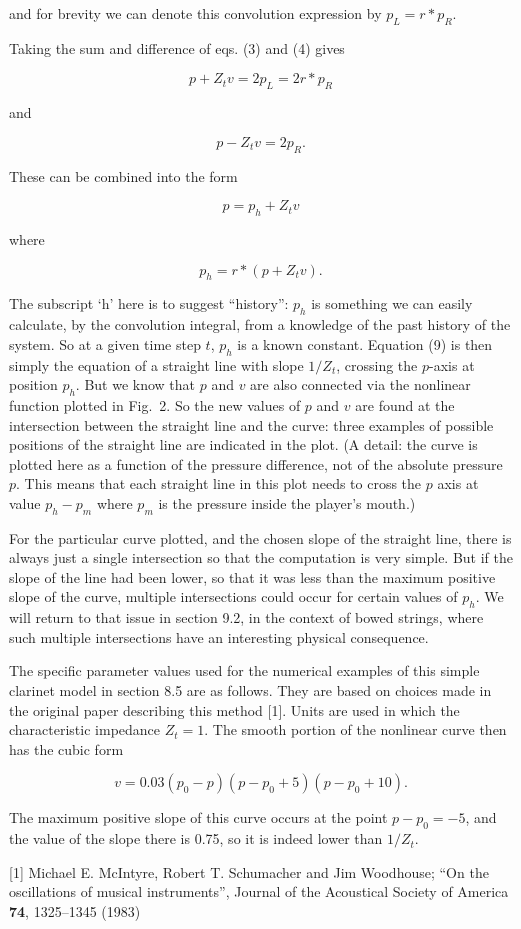   and for brevity we can denote this convolution expression by $p_L=r*p_R$. 

  Taking the sum and difference of eqs. (3) and (4) gives 

  $$p+Z_t v=2 p_L=2r*p_R \tag{7}$$ 

  and 

  $$p-Z_t v=2p_R . \tag{8}$$ 

  These can be combined into the form 

  $$p=p_h + Z_t v \tag{9}$$ 

  where 

  $$p_h=r*(p+Z_t v). \tag{10}$$ 

  The subscript `h' here is to suggest ``history'': $p_h$ is something we can 
  easily calculate, by the convolution integral, from a knowledge of the past 
  history of the system. So at a given time step $t$, $p_h$ is a known 
  constant. Equation (9) is then simply the equation of a straight line with 
  slope $1/Z_t$, crossing the $p$-axis at position $p_h$. But we know that $p$ 
  and $v$ are also connected via the nonlinear function plotted in Fig.\ 2. So 
  the new values of $p$ and $v$ are found at the intersection between the 
  straight line and the curve: three examples of possible positions of the 
  straight line are indicated in the plot. (A detail: the curve is plotted here 
  as a function of the pressure difference, not of the absolute pressure $p$. 
  This means that each straight line in this plot needs to cross the $p$ axis 
  at value $p_h-p_m$ where $p_m$ is the pressure inside the player's mouth.) 

  For the particular curve plotted, and the chosen slope of the straight line, 
  there is always just a single intersection so that the computation is very 
  simple. But if the slope of the line had been lower, so that it was less than 
  the maximum positive slope of the curve, multiple intersections could occur 
  for certain values of $p_h$. We will return to that issue in section 9.2, in 
  the context of bowed strings, where such multiple intersections have an 
  interesting physical consequence. 

  The specific parameter values used for the numerical examples of this simple 
  clarinet model in section 8.5 are as follows. They are based on choices made 
  in the original paper describing this method [1]. Units are used in which the 
  characteristic impedance $Z_t=1$. The smooth portion of the nonlinear curve 
  then has the cubic form 

  $$v=0.03(p_0 -p)(p-p_0+5)(p-p_0+10) . \tag{11}$$ 

  The maximum positive slope of this curve occurs at the point $p-p_0=-5$, and 
  the value of the slope there is 0.75, so it is indeed lower than $1/Z_t$. 

  \sectionreferences{}[1] Michael E. McIntyre, Robert T. Schumacher and Jim 
  Woodhouse; ``On the oscillations of musical instruments'', Journal of the 
  Acoustical Society of America \textbf{74}, 1325--1345 (1983) 